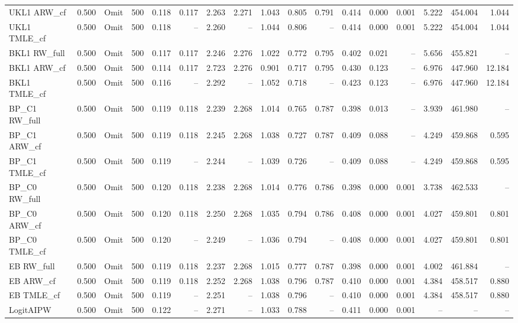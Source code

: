\begin{tabular}{llllrrrrrrrrrrrrr}
UKL1 ARW\_cf & 0.500 & Omit & 500 & 0.118 & 0.117 & 2.263 & 2.271 & 1.043 & 0.805 & 0.791 & 0.414 & 0.000 & 0.001 & 5.222 & 454.004 & 1.044 \\
UKL1 TMLE\_cf & 0.500 & Omit & 500 & 0.118 & -- & 2.260 & -- & 1.044 & 0.806 & -- & 0.414 & 0.000 & 0.001 & 5.222 & 454.004 & 1.044 \\
BKL1 RW\_full & 0.500 & Omit & 500 & 0.117 & 0.117 & 2.246 & 2.276 & 1.022 & 0.772 & 0.795 & 0.402 & 0.021 & -- & 5.656 & 455.821 & -- \\
BKL1 ARW\_cf & 0.500 & Omit & 500 & 0.114 & 0.117 & 2.723 & 2.276 & 0.901 & 0.717 & 0.795 & 0.430 & 0.123 & -- & 6.976 & 447.960 & 12.184 \\
BKL1 TMLE\_cf & 0.500 & Omit & 500 & 0.116 & -- & 2.292 & -- & 1.052 & 0.718 & -- & 0.423 & 0.123 & -- & 6.976 & 447.960 & 12.184 \\
BP\_C1 RW\_full & 0.500 & Omit & 500 & 0.119 & 0.118 & 2.239 & 2.268 & 1.014 & 0.765 & 0.787 & 0.398 & 0.013 & -- & 3.939 & 461.980 & -- \\
BP\_C1 ARW\_cf & 0.500 & Omit & 500 & 0.119 & 0.118 & 2.245 & 2.268 & 1.038 & 0.727 & 0.787 & 0.409 & 0.088 & -- & 4.249 & 459.868 & 0.595 \\
BP\_C1 TMLE\_cf & 0.500 & Omit & 500 & 0.119 & -- & 2.244 & -- & 1.039 & 0.726 & -- & 0.409 & 0.088 & -- & 4.249 & 459.868 & 0.595 \\
BP\_C0 RW\_full & 0.500 & Omit & 500 & 0.120 & 0.118 & 2.238 & 2.268 & 1.014 & 0.776 & 0.786 & 0.398 & 0.000 & 0.001 & 3.738 & 462.533 & -- \\
BP\_C0 ARW\_cf & 0.500 & Omit & 500 & 0.120 & 0.118 & 2.250 & 2.268 & 1.035 & 0.794 & 0.786 & 0.408 & 0.000 & 0.001 & 4.027 & 459.801 & 0.801 \\
BP\_C0 TMLE\_cf & 0.500 & Omit & 500 & 0.120 & -- & 2.249 & -- & 1.036 & 0.794 & -- & 0.408 & 0.000 & 0.001 & 4.027 & 459.801 & 0.801 \\
EB RW\_full & 0.500 & Omit & 500 & 0.119 & 0.118 & 2.237 & 2.268 & 1.015 & 0.777 & 0.787 & 0.398 & 0.000 & 0.001 & 4.002 & 461.884 & -- \\
EB ARW\_cf & 0.500 & Omit & 500 & 0.119 & 0.118 & 2.252 & 2.268 & 1.038 & 0.796 & 0.787 & 0.410 & 0.000 & 0.001 & 4.384 & 458.517 & 0.880 \\
EB TMLE\_cf & 0.500 & Omit & 500 & 0.119 & -- & 2.251 & -- & 1.038 & 0.796 & -- & 0.410 & 0.000 & 0.001 & 4.384 & 458.517 & 0.880 \\
LogitAIPW & 0.500 & Omit & 500 & 0.122 & -- & 2.271 & -- & 1.033 & 0.788 & -- & 0.411 & 0.000 & 0.001 & -- & -- & -- \\

\end{tabular}
